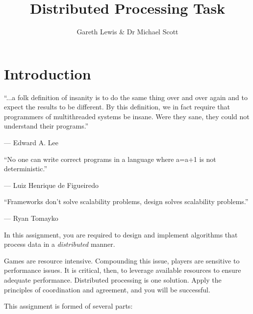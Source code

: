 \documentclass{../../fal_assignment}
\title{Distributed Processing Task}
\author{Gareth Lewis \& Dr Michael Scott}
\begin{document}
\maketitle

\section*{Introduction}

\begin{marginquote}
``...a folk definition of insanity is to do the same thing over and over again and to expect the results to be different. By this definition, we in fact require that programmers of multithreaded systems be insane. Were they sane, they could not understand their programs.''

--- Edward A. Lee

\marginquoterule

``No one can write correct programs in a language where a=a+1 is not deterministic.''

\par --- Luiz Henrique de Figueiredo

\marginquoterule

``Frameworks don't solve scalability problems, design solves scalability problems.''

\par --- Ryan Tomayko

\end{marginquote}

In this assignment, you are required to design and implement algorithms that process data in a \textit{distributed} manner.

Games are resource intensive. Compounding this issue, players are sensitive to performance issues. It is critical, then, to leverage available resources to ensure adequate performance. Distributed processing is one solution. Apply the principles of coordination and agreement, and you will be successful. 

This assignment is formed of several parts:
\end{document}
